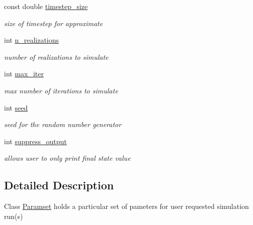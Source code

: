 \begin{DoxyCompactItemize}
\mbox{\label{class_paramset_a0554913cf803a67bc59ffdee154abc24}} 
const double \hyperlink{class_paramset_a0554913cf803a67bc59ffdee154abc24}{timestep\+\_\+size}
\begin{DoxyCompactList}\small\item\em size of timestep for approximate \end{DoxyCompactList}\item 
\mbox{\label{class_paramset_a50c0325e75983b66d0825406ec7873ac}} 
int \hyperlink{class_paramset_a50c0325e75983b66d0825406ec7873ac}{n\+\_\+realizations}
\begin{DoxyCompactList}\small\item\em number of realizations to simulate \end{DoxyCompactList}\item 
\mbox{\label{class_paramset_afeb86c327cd6966707996019609e6ed1}} 
int \hyperlink{class_paramset_afeb86c327cd6966707996019609e6ed1}{max\+\_\+iter}
\begin{DoxyCompactList}\small\item\em max number of iterations to simulate \end{DoxyCompactList}\item 
\mbox{\label{class_paramset_ab8a5866bb87cc2d78a69c47bacaeb06e}} 
int \hyperlink{class_paramset_ab8a5866bb87cc2d78a69c47bacaeb06e}{seed}
\begin{DoxyCompactList}\small\item\em seed for the random number generator \end{DoxyCompactList}\item 
\mbox{\label{class_paramset_a43e8f2987712248fa2139946af93c072}} 
int \hyperlink{class_paramset_a43e8f2987712248fa2139946af93c072}{suppress\+\_\+output}
\begin{DoxyCompactList}\small\item\em allows user to only print final state value \end{DoxyCompactList}\end{DoxyCompactItemize}


\subsection{Detailed Description}
Class \hyperlink{class_paramset}{Paramset} holds a particular set of pameters for user requested simulation run(s) 

